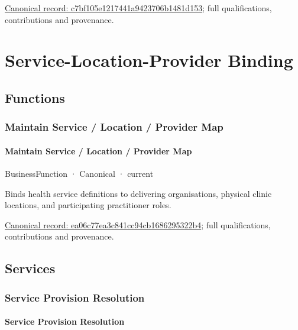 {\footnotesize \href{../../../../continuum/business/business-service/c7bf105e1217441a9423706b1481d153.md}{Canonical record: c7bf105e1217441a9423706b1481d153}; full qualifications, contributions and provenance.}\par
\section{Service-Location-Provider Binding}

\subsection{Functions}

\subsubsection{Maintain Service / Location / Provider Map}

\paragraph{Maintain Service / Location / Provider Map}

\label{element:ea06c77ea3c841cc94cb1686295322b4}
{\small BusinessFunction · Canonical · current}\par

Binds health service definitions to delivering organisations, physical clinic locations, and participating practitioner roles.


{\footnotesize \href{../../../../continuum/business/business-function/ea06c77ea3c841cc94cb1686295322b4.md}{Canonical record: ea06c77ea3c841cc94cb1686295322b4}; full qualifications, contributions and provenance.}\par
\subsection{Services}

\subsubsection{Service Provision Resolution}

\paragraph{Service Provision Resolution}

